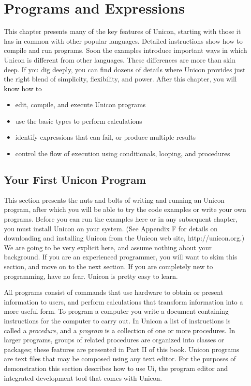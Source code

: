 \chapter{Programs and Expressions}

This chapter presents many of the key features of Unicon, starting
with those it has in common with other popular languages. Detailed
instructions show how to compile and run
programs. Soon the examples introduce important ways in which Unicon
is different from other languages. These differences are more than
skin deep. If you dig deeply, you can find dozens of details where
Unicon provides just the right blend of simplicity, flexibility, and
power.  After this chapter, you will know how to
\begin{itemize}\itemsep0pt
  \item edit, compile, and execute Unicon programs
  \item use the basic types to perform calculations
  \item identify expressions that can fail, or
    produce multiple results
  \item control the flow of execution using conditionals, looping, and
    procedures
\end{itemize}

\section{Your First Unicon Program}

This section presents the nuts and bolts of writing and running an
Unicon program, after which you will be able to try
the code examples or write your own programs. Before you can run the
examples here or in any subsequent chapter, you must
install Unicon on your system. (See Appendix F for
details on downloading and installing Unicon from the Unicon web site,
http://unicon.org.) We are going to be very explicit here,
and assume nothing about your background. If you are an experienced
programmer, you will want to skim this section, and move on to the next
section. If you are completely new to programming, have no fear. Unicon
is pretty easy to learn.

All programs consist of commands that use hardware to obtain or present
information to users, and perform calculations that transform
information into a more useful form. To program a
computer you write a document containing instructions for the computer
to carry out. In Unicon a list of instructions is called
a \textit{procedure}, and a
\textit{program} is a collection of one or more
procedures. In larger programs, groups of related procedures are
organized into classes or packages; these features are presented in
Part II of this book. Unicon programs are text files that may be
composed using any text editor. For the purposes of
demonstration this section describes how to use Ui, the
program editor and integrated development tool that comes with Unicon.

